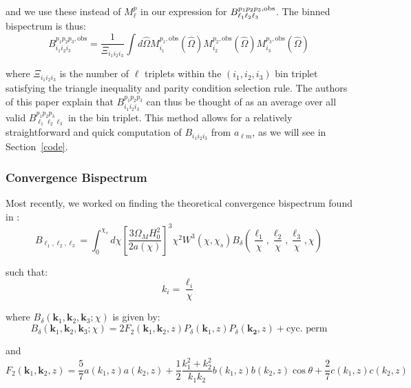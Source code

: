 \documentclass[11pt]{article}
\renewcommand{\_}[1]{\underline{ #1 }}
\newcommand{\npar}{\vspace{.3cm}\newline}
\begin{document}
{and we use these instead of $M_{\ell}^p$ in our expression for $B_{\ell_1 \ell_2 \ell_3}^{p_1 p_2 p_3, \rm{obs}}$. The binned bispectrum is thus:
\begin{equation}
    B_{i_1 i_2 i_3}^{p_1 p_2 p_3, \mathrm{obs}}=\frac{1}{\Xi_{i_1 i_2 i_3}} \int d \hat{\Omega} M_{i_1}^{p_1, \mathrm{obs}}(\hat{\Omega}) M_{i_2}^{p_2, \mathrm{obs}}(\hat{\Omega}) M_{i_3}^{p_3, \mathrm{obs}}(\hat{\Omega})
\end{equation}

where $\Xi_{i_1 i_2 i_3}$ is the number of $\ell$ triplets within the $\left(i_1, i_2, i_3\right)$ bin triplet satisfying the triangle inequality and parity condition selection rule. The authors of this paper explain that $B_{i_1 i_2 i_3}^{p_1 p_2 p_3}$ can thus be thought of as an average over all valid $B_{\ell_1 \ell_2 \ell_3}^{p_1 p_2 p_3}$ in the bin triplet.
\npar
This method allows for a relatively straightforward and quick computation of $B_{i_1 i_2 i_3}$ from $a_{\ell m}$, as we will see in Section~\ref{code}.

\subsubsection{Convergence Bispectrum}\label{convergencebispec}

Most recently, we worked on finding the theoretical convergence bispectrum found in \cite{Munshi_2020}:
\begin{equation}
    B_{\ell_1, \ell_2, \ell_3} = \int_0^{\chi_s} d\chi \left[\frac{3\Omega_M H_0^2}{2a(\chi)}\right]^3 \chi^2 W^3(\chi, \chi_s) B_{\delta}\left(\frac{\ell_1}{\chi}, \frac{\ell_2}{\chi}, \frac{\ell_3}{\chi}, \chi\right)
\end{equation}

such that:
\begin{equation}
    k_i = \frac{\ell_i}{\chi}
\end{equation}

where $B_{\delta}(\mathbf{k}_1, \mathbf{k}_2, \mathbf{k}_3; \chi)$ is given by:
\begin{equation}
    B_{\delta}(\mathbf{k}_1, \mathbf{k}_2, \mathbf{k}_3; \chi) = 2F_2(\mathbf{k}_1, \mathbf{k}_2, z)P_{\delta}(\mathbf{k}_1,z)P_{\delta}(\mathbf{k_2},z) + \text{cyc. perm}
\end{equation}

and
\begin{equation}
    F_2(\mathbf{k}_1, \mathbf{k}_2, z) = \frac57 a(k_1, z)a(k_2, z) + \frac12 \frac{k_1^2 + k_2^2}{k_1k_2}b(k_1, z)b (k_2,z)\cos\theta + \frac27 c(k_1, z)c(k_2,z)
\end{equation}

}
\end{document}
